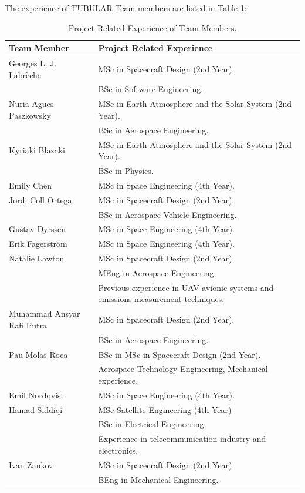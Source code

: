 \documentclass[a4paper,12pt,twoside]{article}
\begin{document}
The experience of TUBULAR Team members are listed in Table \ref{tab:team-member-experience}:

\begin{table}[H]
\centering
\begin{tabular}{|l|m{11cm}|}
\hline
\textbf{Team Member} & \textbf{Project Related Experience} \\ \hline
Georges L. J. Labrèche & MSc in Spacecraft Design (2nd Year). \\& BSc in Software Engineering.\\ \hline
Nuria Agues Paszkowsky & MSc in Earth Atmosphere and the Solar System (2nd Year). \\& BSc in Aerospace Engineering.\\ \hline
Kyriaki Blazaki & MSc in Earth Atmosphere and the Solar System (2nd Year). \\& BSc in Physics. \\ \hline
Emily Chen & MSc in Space Engineering (4th Year). \\ \hline
Jordi Coll Ortega & MSc in Spacecraft Design (2nd Year). \\& BSc in Aerospace Vehicle Engineering. \\ \hline
Gustav Dyrssen &  MSc in Space Engineering (4th Year).\\ \hline
Erik Fagerström & MSc in Space Engineering (4th Year). \\ \hline
Natalie Lawton & MSc in Spacecraft Design (2nd Year). \\& MEng in Aerospace Engineering.\\& Previous experience in UAV avionic systems and emissions measurement techniques. \\ \hline
Muhammad Ansyar Rafi Putra & MSc in Spacecraft Design (2nd Year). \\& BSc in Aerospace Engineering. \\ \hline
Pau Molas Roca & BSc in MSc in Spacecraft Design (2nd Year). \\& Aerospace Technology Engineering, Mechanical experience. \\ \hline
Emil Nordqvist & MSc in Space Engineering (4th Year). \\ \hline
Hamad Siddiqi & MSc Satellite Engineering (4th Year) \\&  BSc in Electrical Engineering.\\& Experience in telecommunication industry and electronics.  \\ \hline
Ivan Zankov & MSc in Spacecraft Design (2nd Year). \\& BEng in Mechanical Engineering.\\ \hline
\end{tabular}
\caption{Project Related Experience of Team Members.}
\label{tab:team-member-experience}
\end{table}
\raggedbottom
\end{document}
